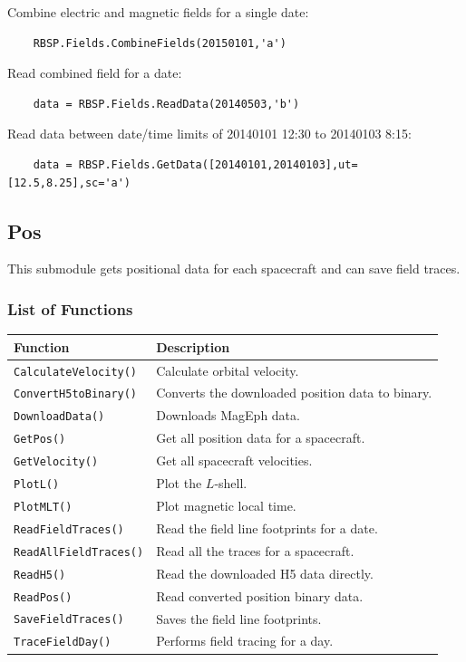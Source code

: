 	Combine electric and magnetic fields for a single date:
	
	\begin{verbatim}
	RBSP.Fields.CombineFields(20150101,'a')
	\end{verbatim}
	
	Read combined field for a date:
	
	\begin{verbatim}
	data = RBSP.Fields.ReadData(20140503,'b')
	\end{verbatim}
	
	Read data between date/time limits of 20140101 12:30 to 20140103 8:15:
	
	\begin{verbatim}
	data = RBSP.Fields.GetData([20140101,20140103],ut=[12.5,8.25],sc='a')
	\end{verbatim}
	
	\subsection{Pos}
	
	This submodule gets positional data for each spacecraft and can save field traces.
	
	\subsubsection{List of Functions}
	
	\begin{tabular}{|l|l|}
	\hline
	Function & Description \\
	\hline
	\texttt{CalculateVelocity()} & Calculate orbital velocity. \\
	\texttt{ConvertH5toBinary()} & Converts the downloaded position data to binary. \\
	\texttt{DownloadData()} & Downloads MagEph data. \\
	\texttt{GetPos()} & Get all position data for a spacecraft. \\
	\texttt{GetVelocity()} & Get all spacecraft velocities. \\
	\texttt{PlotL()} & Plot the $L$-shell. \\
	\texttt{PlotMLT()} & Plot magnetic local time. \\
	\texttt{ReadFieldTraces()} & Read the field line footprints for a date. \\
	\texttt{ReadAllFieldTraces()} & Read all the traces for a spacecraft. \\
	\texttt{ReadH5()} & Read the downloaded H5 data directly. \\
	\texttt{ReadPos()} & Read converted position binary data. \\
	\texttt{SaveFieldTraces()} & Saves the field line footprints. \\
	\texttt{TraceFieldDay()} & Performs field tracing for a day. \\
	\hline
	\end{tabular}
	
